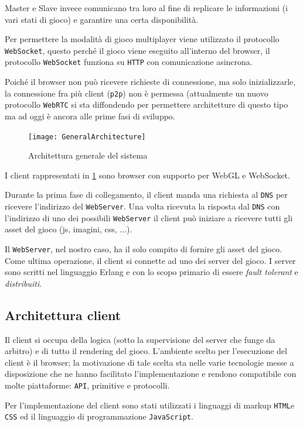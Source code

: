 \documentclass[paper=a4, fontsize=11pt]{scrartcl} %
\numberwithin{equation}{section} %
\numberwithin{figure}{section} %
\numberwithin{table}{section} %
\begin{document}
Master e Slave invece comunicano tra loro al fine di replicare le informazioni (i vari stati di gioco) e garantire una certa disponibilità.

Per permettere la modalità di gioco multiplayer viene utilizzato il protocollo \texttt{WebSocket}, questo perché il gioco viene eseguito all'interno del browser, il protocollo \texttt{WebSocket}
funziona su \texttt{HTTP} con comunicazione asincrona.

Poiché il browser non può ricevere richieste di connessione, ma solo inizializzarle, la connessione fra più client (\texttt{p2p}) non è permessa (attualmente un nuovo protocollo \texttt{WebRTC} si sta
diffondendo per permettere architetture di questo tipo ma ad oggi è ancora alle prime fasi di sviluppo.

\begin{figure}
\centering
\texttt{[image: GeneralArchitecture]}
\caption{Architettura generale del sistema}
\label{GenArc}
\end{figure}

I client rappresentati in \ref{GenArc} sono browser con supporto per WebGL e WebSocket.

Durante la prima fase di collegamento, il client manda una richiesta al \texttt{DNS} per ricevere l'indirizzo del \texttt{WebServer}.
Una volta ricevuta la risposta dal \texttt{DNS} con l'indirizzo di uno dei possibili \texttt{WebServer} il client può iniziare a ricevere tutti gli asset del gioco (js, imagini, css, ...).

Il \texttt{WebServer}, nel nostro caso, ha il solo compito di fornire gli asset del gioco. Come ultima operazione, il client si connette ad uno dei server del gioco. I server sono scritti nel linguaggio Erlang e con lo scopo primario di essere \textit{fault tolerant} e \textit{distribuiti}.


\subsection{Architettura client}
Il client si occupa della logica (sotto la supervisione del server che funge da arbitro) e di tutto il rendering del gioco.
L'ambiente scelto per l'esecuzione del client è il browser; la motivazione di tale scelta sta nelle varie tecnologie messe a disposizione che ne hanno facilitato l'implementazione e rendono compatibile con molte piattaforme: \texttt{API}, primitive e protocolli.

Per l'implementazione del client sono stati utilizzati i linguaggi di markup \texttt{HTML}e \texttt{CSS} ed il linguaggio di programmazione \texttt{JavaScript}.
\end{document}
